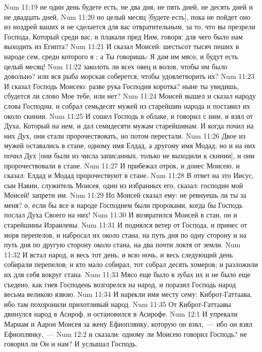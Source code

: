 \vs Num 11:19 не один день будете есть, не два дня, не пять дней, не десять дней и не двадцать дней,
\vs Num 11:20 но целый месяц [будете есть], пока не пойдет оно из ноздрей ваших и не сделается для вас отвратительным, за то, что вы презрели Господа, Который среди вас, и плакали пред Ним, говоря: для чего было нам выходить из Египта?
\vs Num 11:21 И сказал Моисей: шестьсот тысяч пеших в народе сем, среди которого я ; а Ты говоришь: Я дам им мясо, и будут есть целый месяц!
\vs Num 11:22 заколоть ли всех овец и волов, чтобы им было довольно? или вся рыба морская соберется, чтобы удовлетворить их?
\vs Num 11:23 И сказал Господь Моисею: разве рука Господня коротка? ныне ты увидишь, сбудется ли слово Мое тебе, или нет?
\rsbpar\vs Num 11:24 Моисей вышел и сказал народу слова Господни, и собрал семьдесят мужей из старейшин народа и поставил их около скинии.
\vs Num 11:25 И сошел Господь в облаке, и говорил с ним, и взял от Духа, Который на нем, и дал семидесяти мужам старейшинам. И когда почил на них Дух, они стали пророчествовать, но потом перестали.
\vs Num 11:26 Двое из мужей оставались в стане, одному имя Елдад, а другому имя Модад; но и на них почил Дух [они были из числа записанных, только не выходили к скинии], и они пророчествовали в стане.
\vs Num 11:27 И прибежал отрок, и донес Моисею, и сказал: Елдад и Модад пророчествуют в стане.
\vs Num 11:28 В ответ на это Иисус, сын Навин, служитель Моисея, один из избранных его, сказал: господин мой Моисей! запрети им.
\vs Num 11:29 Но Моисей сказал ему: не ревнуешь ли ты за меня? о, если бы все в народе Господнем были пророками, когда бы Господь послал Духа Своего на них!
\vs Num 11:30 И возвратился Моисей в стан, он и старейшины Израилевы.
\vs Num 11:31 И поднялся ветер от Господа, и принес от моря перепелов, и набросал их около стана, на путь дня по одну сторону и на путь дня по другую сторону около стана, на два почти локтя от земли.
\vs Num 11:32 И встал народ, и весь тот день, и всю ночь, и весь следующий день собирали перепелов; и кто мало собирал, тот собрал десять хомеров; и разложили их для себя вокруг стана.
\vs Num 11:33 Мясо еще было в зубах их и не было еще съедено, как гнев Господень возгорелся на народ, и поразил Господь народ весьма великою язвою.
\vs Num 11:34 И нарекли имя месту сему: Киброт-Гаттаава, ибо там похоронили прихотливый народ.
\vs Num 11:35 От Киброт-Гаттаавы двинулся народ в Асироф, и остановился в Асирофе.
\vs Num 12:1 И упрекали Мариам и Аарон Моисея за жену Ефиоплянку, которую он взял,~--- ибо он взял  Ефиоплянку,~---
\vs Num 12:2 и сказали: одному ли Моисею говорил Господь? не говорил ли Он и нам? И услышал  Господь.
